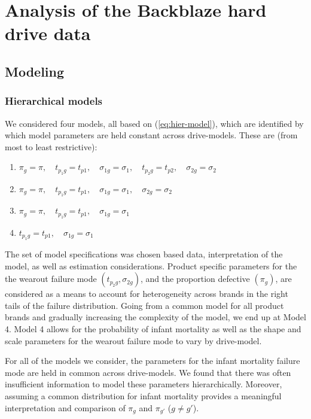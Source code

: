 \documentclass[aoas]{imsart}
\begin{document}
\section{Analysis of the Backblaze hard drive data}
\label{sec:Data analysis}
\subsection{Modeling}
\subsubsection{Hierarchical models}
We considered four models, all based on (\ref{eq:hier-model}), which are identified by which model parameters are held constant across drive-models. These are (from most to least restrictive):

\begin{enumerate}
\item $\pi_{g} = \pi,\quad t_{p_{1}g} = t_{p1},\quad \sigma_{1g}=\sigma_1,\quad t_{p_{2}g} = t_{p2},\quad \sigma_{2g} = \sigma_2$
\item $\pi_{g} = \pi,\quad t_{p_{1}g} = t_{p1},\quad \sigma_{1g}=\sigma_1,\quad \sigma_{2g} = \sigma_2$
\item $\pi_{g} = \pi,\quad  t_{p_{1}g}= t_{p1},\quad \sigma_{1g}=\sigma_1$
\item $t_{p_{1}g}= t_{p1},\quad \sigma_{1g}=\sigma_1$
\end{enumerate}

The set of model specifications was chosen based data, interpretation of the model, as well as estimation considerations.  Product specific parameters for the the wearout failure mode $(t_{p_{2}g},\sigma_{2g})$, and the proportion defective $(\pi_g)$, are considered as a means to account for heterogeneity across brands in the right tails of the failure distribution.  Going from a common model for all product brands and gradually increasing the complexity of the model, we end up at Model 4.  Model 4 allows for the probability of infant mortality as well as the shape and scale parameters for the wearout failure mode to vary by drive-model.

For all of the models we consider, the parameters for the infant mortality failure mode are held in common across drive-models.  We found that there was often insufficient information to model these parameters hierarchically.  Moreover, assuming a common distribution for infant mortality provides a meaningful interpretation and comparison of $\pi_g$ and $\pi_{g'}$ ($g \neq g'$). 
\end{document}
